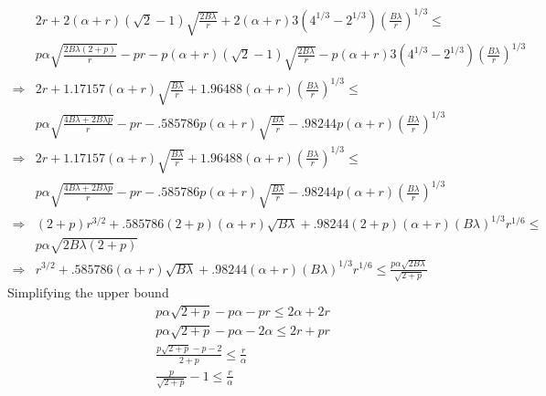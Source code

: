 \documentclass[12pt]{article}
\theoremstyle{plain}
\theoremstyle{remark}
\theoremstyle{definition}
\renewcommand{\leq}{\leqslant}
\renewcommand{\leq}{\leqslant}
\begin{document}
\begin{align}
    &2r + 2(\alpha + r)(\sqrt{2}-1)\sqrt{\frac{2B\lambda }{r}} +  2(\alpha + r)3(4^{1/3}-2^{1/3})(\frac{B\lambda}{r})^{1/3} \leq \\
    &p\alpha\sqrt{\frac{2B\lambda (2+p)}{r}}- pr -p (\alpha + r)(\sqrt{2}-1)\sqrt{\frac{2B\lambda }{r}}-p (\alpha + r) 3(4^{1/3}-2^{1/3})(\frac{B\lambda}{r})^{1/3}\\
    \Rightarrow &2r + 1.17157(\alpha + r)\sqrt{\frac{B\lambda }{r}} +  1.96488(\alpha + r)(\frac{B\lambda}{r})^{1/3} \leq \\
    &p\alpha\sqrt{\frac{4B\lambda+2B\lambda p}{r}}- pr -.585786p (\alpha + r)\sqrt{\frac{B\lambda }{r}}-.98244p (\alpha + r) (\frac{B\lambda}{r})^{1/3}\\
    \Rightarrow &2r + 1.17157(\alpha + r)\sqrt{\frac{B\lambda }{r}} +  1.96488(\alpha + r)(\frac{B\lambda}{r})^{1/3} \leq \\
    &p\alpha\sqrt{\frac{4B\lambda+2B\lambda p}{r}}- pr -.585786p (\alpha + r)\sqrt{\frac{B\lambda }{r}}-.98244p (\alpha + r) (\frac{B\lambda}{r})^{1/3}\\
    \Rightarrow &(2+p)r^{3/2} + .585786(2+p)(\alpha + r)\sqrt{B\lambda} +  .98244(2+p)(\alpha + r)(B\lambda)^{1/3}r^{1/6}\leq \\
    &p\alpha\sqrt{2B\lambda (2+p)}\\
    \Rightarrow &r^{3/2} + .585786(\alpha + r)\sqrt{B\lambda} +  .98244(\alpha + r)(B\lambda)^{1/3}r^{1/6}\leq \frac{p\alpha\sqrt{2B\lambda}}{\sqrt{2+p}}
\end{align}
Simplifying the upper bound
\begin{align}
    & p\alpha\sqrt{2+p}-p\alpha - pr  \leq 2\alpha + 2r\\
    & p\alpha\sqrt{2+p} - p\alpha - 2\alpha \leq  2r + pr \\
    & \frac{p\sqrt{2+p}-p -2}{2+p} \leq \frac{r}{\alpha}\\
    & \frac{p}{\sqrt{2+p}}-1 \leq \frac{r}{\alpha}\\
\end{align}
\end{document}
